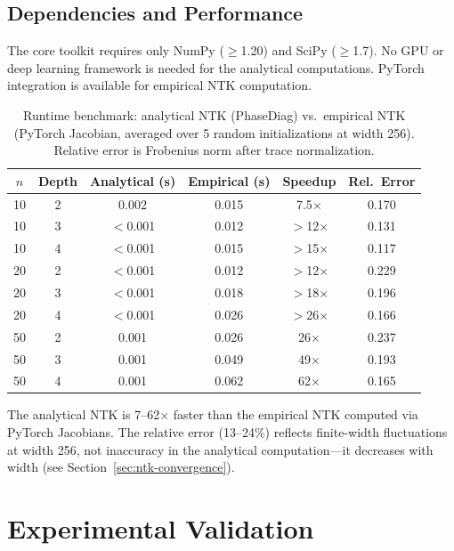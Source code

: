 \documentclass[10pt]{article}
\theoremstyle{definition}
\begin{document}
\subsection{Dependencies and Performance}

The core toolkit requires only NumPy ($\geq$1.20) and SciPy ($\geq$1.7).
No GPU or deep learning framework is needed for the analytical computations.
PyTorch integration is available for empirical NTK computation.

\begin{table}[t]
\centering
\caption{Runtime benchmark: analytical NTK (PhaseDiag) vs.\ empirical NTK (PyTorch Jacobian, averaged over 5 random initializations at width 256).
Relative error is Frobenius norm after trace normalization.}
\label{tab:benchmark}
\begin{tabular}{cccccc}
\toprule
$n$ & Depth & Analytical (s) & Empirical (s) & Speedup & Rel.\ Error \\
\midrule
10 & 2 & 0.002 & 0.015 & 7.5$\times$ & 0.170 \\
10 & 3 & $<$0.001 & 0.012 & $>$12$\times$ & 0.131 \\
10 & 4 & $<$0.001 & 0.015 & $>$15$\times$ & 0.117 \\
20 & 2 & $<$0.001 & 0.012 & $>$12$\times$ & 0.229 \\
20 & 3 & $<$0.001 & 0.018 & $>$18$\times$ & 0.196 \\
20 & 4 & $<$0.001 & 0.026 & $>$26$\times$ & 0.166 \\
50 & 2 & 0.001 & 0.026 & 26$\times$ & 0.237 \\
50 & 3 & 0.001 & 0.049 & 49$\times$ & 0.193 \\
50 & 4 & 0.001 & 0.062 & 62$\times$ & 0.165 \\
\bottomrule
\end{tabular}
\end{table}

The analytical NTK is 7--62$\times$ faster than the empirical NTK computed via PyTorch Jacobians.
The relative error (13--24\%) reflects finite-width fluctuations at width 256, not inaccuracy in the analytical computation---it decreases with width (see Section~\ref{sec:ntk-convergence}).

\section{Experimental Validation}
\label{sec:real-validation}
\end{document}
